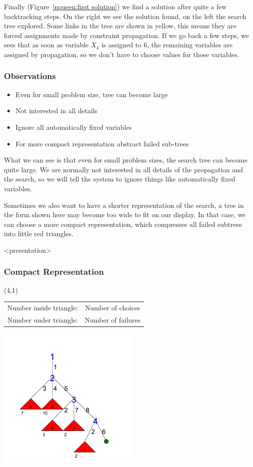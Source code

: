 Finally (Figure~\ref{nqueen:first solution}) we find a solution after quite a few backtracking steps. On the right we see the solution found, on the left the search tree explored. Some links in the tree are shown in yellow, this means they are forced assignments made by constraint propagation. If we go back a few steps, we sees that as soon as variable $X_4$ is assigned to 6, the remaining variables are assigned by propagation, so we don't have to choose values for those variables.

\begin{frame}
\frametitle{Observations}
\begin{itemize}
\item Even for small problem size, tree can become large
\item Not interested in all details
\item Ignore all automatically fixed variables
\item For more compact representation abstract failed sub-trees
\end{itemize}
\end{frame}

What we can see is that even for small problem sizes, the search tree can become quite large. We are normally not interested in all details of the propagation and the search, so we will tell the system to ignore things like automatically fixed variables.

Sometimes we also want to have a shorter representation of the search, a tree in the form shown here may become too wide to fit on our display. In that case, we can choose a more compact representation, which compresses all failed subtrees into little red triangles.

\begin{frame}<presentation>
\frametitle{Compact Representation}
\begin{textblock}{7}(4,1)
\begin{tabular}{cc}
Number inside triangle:& Number of choices\\
Number under triangle:& Number of failures
\end{tabular}
\end{textblock}
\includegraphics[width=7cm]{../nqueen/compact/tree_compact}
\end{frame}

